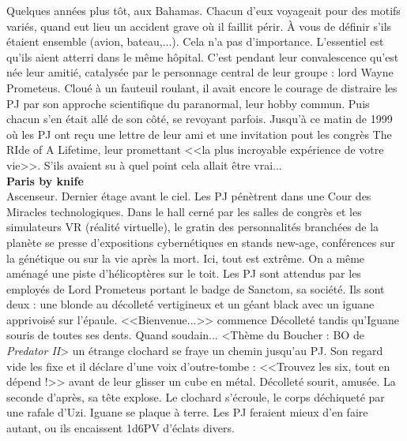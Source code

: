 \documentclass[11pt,twoside,a4paper]{book}
\begin{document}
Quelques ann{\'e}es plus t{\^o}t, aux Bahamas. Chacun d'eux voyageait pour des motifs vari{\'e}s, quand eut lieu un accident grave o{\`u} il faillit p{\'e}rir. {\`A} vous de d{\'e}finir s'ils {\'e}taient ensemble (avion, bateau,...). Cela n'a pas d'importance. L'essentiel est qu'ils aient atterri dans le m{\^e}me h{\^o}pital. C'est pendant leur convalescence qu'est n{\'e}e leur amiti{\'e}, catalys{\'e}e par le personnage central de leur groupe : lord Wayne Prometeus. Clou{\'e} {\`a} un fauteuil roulant, il avait encore le courage de distraire les PJ par son approche scientifique du paranormal, leur hobby commun. Puis chacun s'en {\'e}tait all{\'e} de son c{\^o}t{\'e}, se revoyant parfois. Jusqu'{\`a} ce matin de 1999 o{\`u} les PJ ont re\c{c}u une lettre de leur ami et une invitation pout les congr{\`e}s The RIde of A Lifetime, leur promettant <<la plus incroyable exp{\'e}rience de votre vie>>. S'ils avaient su {\`a} quel point cela allait {\^e}tre vrai...~\\

\textbf{\large Paris by knife}~\\

Ascenseur. Dernier {\'e}tage avant le ciel. Les PJ p{\'e}n{\`e}trent dans une Cour des Miracles technologiques. Dans le hall cern{\'e} par les salles de congr{\`e}s et les simulateurs VR (r{\'e}alit{\'e} virtuelle), le gratin des personnalit{\'e}s branch{\'e}es de la plan{\`e}te se presse d'expositions cybern{\'e}tiques en stands new-age, conf{\'e}rences sur la g{\'e}n{\'e}tique ou sur la vie apr{\`e}s la mort. Ici, tout est extr{\^e}me. On a m{\^e}me am{\'e}nag{\'e} une piste d'h{\'e}licopt{\`e}res sur le toit. Les PJ sont attendus par les employ{\'e}s de Lord Prometeus portant le badge de Sanctom, sa soci{\'e}t{\'e}. Ils sont deux : une blonde au d{\'e}collet{\'e} vertigineux et un g{\'e}ant black avec un iguane apprivois{\'e} sur l'{\'e}paule. <<Bienvenue...>> commence D{\'e}collet{\'e} tandis qu'Iguane souris de toutes ses dents. Quand soudain... <Th{\`e}me du Boucher : BO de \emph{Predator II}> un {\'e}trange clochard se fraye un chemin jusqu'au PJ. Son regard vide les fixe et il d{\'e}clare d'une voix d'outre-tombe : <<Trouvez les six, tout en d{\'e}pend !>> avant de leur glisser un cube en m{\'e}tal. D{\'e}collet{\'e} sourit, amus{\'e}e. La seconde d'apr{\`e}s, sa t{\^e}te explose. Le clochard s'{\'e}croule, le corps d{\'e}chiquet{\'e} par une rafale d'Uzi. Iguane se plaque {\`a} terre. Les PJ feraient mieux d'en faire autant, ou ils encaissent 1d6PV d'{\'e}clats divers.~\\
\end{document}
